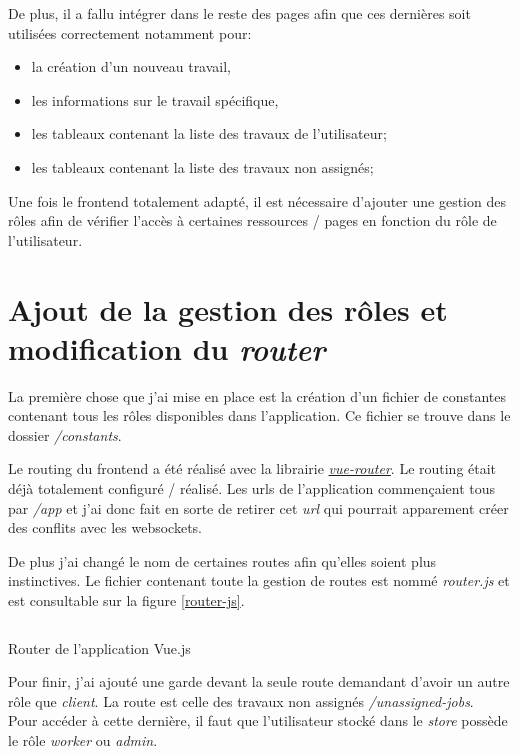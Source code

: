 \documentclass[
    iai, %
    il, %
]{heig-tb}
\begin{document}
De plus, il a fallu intégrer dans le reste des pages afin que ces dernières soit utilisées correctement notamment pour:
\begin{itemize}
    \item la création d'un nouveau travail,
    \item les informations sur le travail spécifique,
    \item les tableaux contenant la liste des travaux de l'utilisateur;
    \item les tableaux contenant la liste des travaux non assignés;
\end{itemize}

Une fois le \Gls{frontend} totalement adapté, il est nécessaire d'ajouter une gestion des rôles afin de vérifier l'accès à certaines ressources / pages en fonction du rôle de l'utilisateur.

\section{Ajout de la gestion des rôles et modification du \emph{router}}
La première chose que j'ai mise en place est la création d'un fichier de constantes contenant tous les rôles disponibles dans l'application. Ce fichier se trouve dans le dossier \emph{/constants}.

Le routing du \Gls{frontend} a été réalisé avec la librairie \href{https://router.vuejs.org/}{\emph{vue-router}}. Le routing était déjà totalement configuré / réalisé. Les urls de l'application commençaient tous par \emph{/app} et j'ai donc fait en sorte de retirer cet \emph{url} qui pourrait apparement créer des conflits avec les \Gls{websockets}.

De plus j'ai changé le nom de certaines routes afin qu'elles soient plus instinctives. Le fichier contenant toute la gestion de routes est nommé \emph{router.js} et est consultable sur la figure \ref{router-js}.

\begin{listing}[h]
    \inputminted{javascript}{assets/code/router.js}
    \caption{Router de l'application Vue.js \label{router-js}}
\end{listing}

Pour finir, j'ai ajouté une garde devant la seule route demandant d'avoir un autre rôle que \emph{client}. La route est celle des travaux non assignés \emph{/unassigned-jobs}. \\
Pour accéder à cette dernière, il faut que l'utilisateur stocké dans le \emph{store} possède le rôle \emph{worker} ou \emph{admin}.
\end{document}
